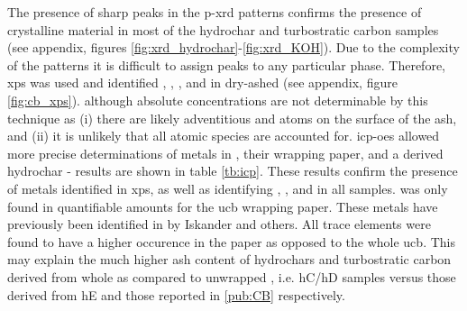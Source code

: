 The presence of sharp peaks in the \acrshort{p-xrd} patterns confirms the presence of crystalline material in most of the \gls{hydrochar} and \gls{turbostratic carbon} samples (see appendix, figures \ref{fig:xrd_hydrochar}-\ref{fig:xrd_KOH}). Due to the complexity of the patterns it is difficult to assign peaks to any particular phase. Therefore, \acrshort{xps} was used and identified , , , and  in dry-ashed  (see appendix, figure \ref{fig:cb_xps}). although absolute concentrations are not determinable by this technique as (i) there are likely adventitious  and  atoms on the surface of the ash, and (ii) it is unlikely that all atomic species are accounted for. \acrshort{icp-oes} allowed more precise determinations of metals in , their wrapping paper, and a derived \gls{hydrochar} - results are shown in table \ref{tb:icp}. These results confirm the presence of metals identified in \acrshort{xps}, as well as identifying , , and  in all samples.  was only found in quantifiable amounts for the \acrshort{ucb} wrapping paper. These metals have previously been identified in  by Iskander and others.\citep{chevalier2018nano, cardoso2018exposure, iskander1992multielement, jenkins1985neutron} All trace elements were found to have a higher occurence in the paper as opposed to the whole \acrshort{ucb}. This may explain the much higher \gls{ash content} of \glspl{hydrochar} and \gls{turbostratic carbon} derived from whole  as compared to unwrapped , i.e. hC/hD  samples versus those derived from hE and those reported in \ref{pub:CB} respectively. 

